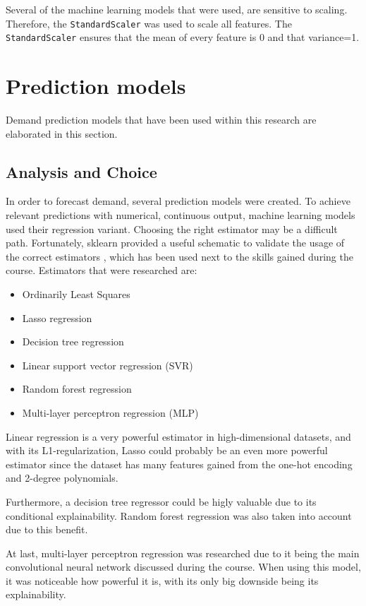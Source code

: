 \documentclass[final,authoryear,5p,times,twocolumn, 11pt]{elsarticle}
\begin{document}
Several of the machine learning models that were used, are sensitive to scaling. Therefore, the \texttt{StandardScaler} was used to scale all features. The \texttt{StandardScaler} ensures that the mean of every feature is 0 and that variance=1.


\section{Prediction models}
\label{sec:models}
Demand prediction models that have been used within this research are elaborated in this section.
\subsection{Analysis and Choice}
In order to forecast demand, several prediction models were created. To achieve relevant predictions with numerical, continuous output, machine learning models used their regression variant. Choosing the right estimator may be a difficult path. Fortunately, sklearn provided a useful schematic to validate the usage of the correct estimators \cite{sklearn estimator choice}, which has been used next to the skills gained during the course. Estimators that were researched are:
\begin{itemize}[noitemsep]
 \item Ordinarily Least Squares
 \item Lasso regression
 \item Decision tree regression
 \item Linear support vector regression (SVR)
 \item Random forest regression
 \item Multi-layer perceptron regression (MLP)
\end{itemize}
Linear regression is a very powerful estimator in high-dimensional datasets, and with its L1-regularization, Lasso could probably be an even more powerful estimator since the dataset has many features gained from the one-hot encoding and 2-degree polynomials. 

Furthermore, a decision tree regressor could be higly valuable due to its conditional explainability. Random forest regression was also taken into account due to this benefit.

At last, multi-layer perceptron regression was researched due to it being the main convolutional neural network discussed during the course. When using this model, it was noticeable how powerful it is, with its only big downside being its explainability.
\end{document}
